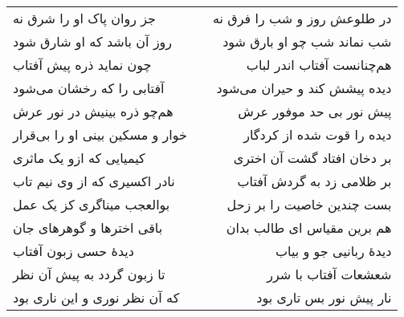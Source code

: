 \begin{center}
\begin{longtable}{l p{0.5cm} r}
جز روان پاک او را شرق نه
&&
در طلوعش روز و شب را فرق نه
\\
روز آن باشد که او شارق شود
&&
شب نماند شب چو او بارق شود
\\
چون نماید ذره پیش آفتاب
&&
هم‌چنانست آفتاب اندر لباب
\\
آفتابی را که رخشان می‌شود
&&
دیده پیشش کند و حیران می‌شود
\\
هم‌چو ذره بینیش در نور عرش
&&
پیش نور بی حد موفور عرش
\\
خوار و مسکین بینی او را بی‌قرار
&&
دیده را قوت شده از کردگار
\\
کیمیایی که ازو یک ماثری
&&
بر دخان افتاد گشت آن اختری
\\
نادر اکسیری که از وی نیم تاب
&&
بر ظلامی زد به گردش آفتاب
\\
بوالعجب میناگری کز یک عمل
&&
بست چندین خاصیت را بر زحل
\\
باقی اخترها و گوهرهای جان
&&
هم برین مقیاس ای طالب بدان
\\
دیدهٔ حسی زبون آفتاب
&&
دیدهٔ ربانیی جو و بیاب
\\
تا زبون گردد به پیش آن نظر
&&
شعشعات آفتاب با شرر
\\
که آن نظر نوری و این ناری بود
&&
نار پیش نور بس تاری بود
\\
\end{longtable}
\end{center}
